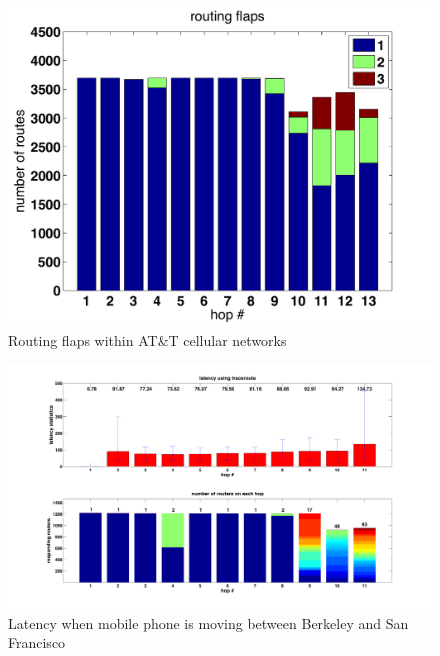 \begin{figure}
  \centering
  \includegraphics[width=\linewidth]{../figs/routing_flaps.pdf}
  \caption{Routing flaps within AT\&T cellular networks}
  \label{fig:mobile_flaps}
\end{figure}

\begin{figure}
  \centering
  \includegraphics[width=\linewidth]{../figs/mobile_sfo.pdf}
  \caption{Latency when mobile phone is moving between Berkeley and San Francisco}
  \label{fig:mobile_mobile}
\end{figure}

